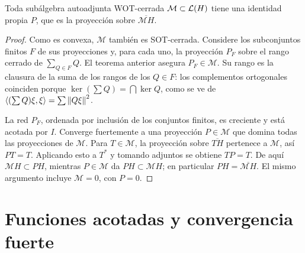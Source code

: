 \begin{teorema}\label{v3:identidad-propia}
Toda subálgebra autoadjunta WOT-cerrada $\mathcal M\subset\mathcal L(H)$ tiene una identidad propia $P$, que es la proyección sobre $\overline{\mathcal M H}$.
\end{teorema}
\begin{proof}
Como es convexa, $\mathcal M$ también es SOT-cerrada. Considere los subconjuntos finitos $F$ de sus proyecciones y, para cada uno, la proyección $P_F$ sobre el rango cerrado de $\sum_{Q\in F}Q$. El teorema anterior asegura $P_F\in\mathcal M$. Su rango es la clausura de la suma de los rangos de los $Q\in F$: los complementos ortogonales coinciden porque
$\ker(\sum Q)=\bigcap\ker Q$, como se ve de $\left\langle(\sum Q)\xi,\xi\right\rangle=\sum\left\lVert Q\xi\right\rVert^2$.

La red $P_F$, ordenada por inclusión de los conjuntos finitos, es creciente y está acotada por $I$. Converge fuertemente a una proyección $P\in\mathcal M$ que domina todas las proyecciones de $\mathcal M$. Para $T\in\mathcal M$, la proyección sobre $\overline{TH}$ pertenece a $\mathcal M$, así $PT=T$. Aplicando esto a $T^*$ y tomando adjuntos se obtiene $TP=T$. De aquí $\mathcal M H\subset PH$, mientras $P\in\mathcal M$ da $PH\subset\mathcal M H$; en particular $PH=\overline{\mathcal M H}$. El mismo argumento incluye $\mathcal M=0$, con $P=0$.
\end{proof}

\section{Funciones acotadas y convergencia fuerte}

